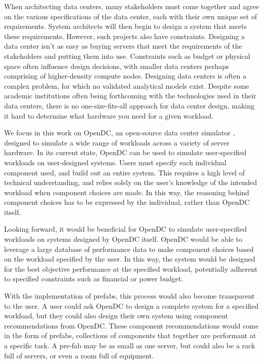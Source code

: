 \documentclass[11pt]{article}
\begin{document}
When architecting data centers, many stakeholders must come together and agree on the various specifications of the data center, each with their own unique set of requirements. 
System architects will then begin to design a system that meets these requirements. 
However, such projects also have constraints. 
Designing a data center isn't as easy as buying servers that meet the requirements of the stakeholders and putting them into use. 
Constraints such as budget or physical space often influence design decisions, with smaller data centers perhaps comprising of higher-density compute nodes. 
Designing data centers is often a complex problem, for which no validated analytical models exist. 
Despite some academic institutions often being forthcoming with the technologies used in their data centers, there is no one-size-fits-all approach for data center design, making it hard to determine what hardware you need for a given workload.

We focus in this work on OpenDC, an open-source data center simulator \cite{Iosup2017}, designed to simulate a wide range of workloads across a variety of server hardware. 
In its current state, OpenDC can be used to simulate user-specified workloads on user-designed systems. 
Users must specify each individual component used, and build out an entire system. 
This requires a high level of technical understanding, and relies solely on the user's knowledge of the intended workload when component choices are made. 
In this way, the reasoning behind component choices has to be expressed by the individual, rather than OpenDC itself. 

Looking forward, it would be beneficial for OpenDC to simulate user-specified workloads on systems designed by OpenDC itself. 
OpenDC would be able to leverage a large database of performance data to make component choices based on the workload specified by the user. 
In this way, the system would be designed for the best objective performance at the specified workload, potentially adherent to specified constraints such as financial or power budget. 

With the implementation of prefabs, this process would also become transparent to the user. 
A user could ask OpenDC to design a complete system for a specified workload, but they could also design their own system using component recommendations from OpenDC. 
These component recommendations would come in the form of prefabs, collections of components that together are performant at a specific task. 
A pre-fab may be as small as one server, but could also be a rack full of servers, or even a room full of equipment. 
\end{document}
